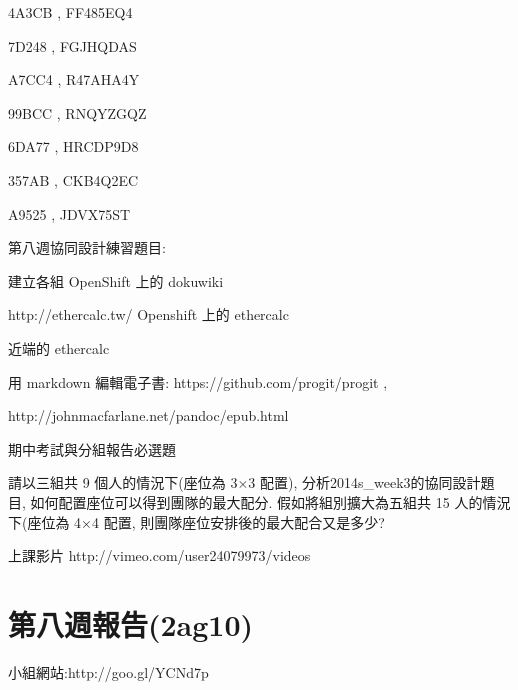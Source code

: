 \documentclass[]{article}
\begin{document}
4A3CB , FF485EQ4

7D248 , FGJHQDAS

A7CC4 , R47AHA4Y

99BCC , RNQYZGQZ

6DA77 , HRCDP9D8

357AB , CKB4Q2EC

A9525 , JDVX75ST

第八週協同設計練習題目:

建立各組 OpenShift 上的 dokuwiki

http://ethercalc.tw/ Openshift 上的 ethercalc

近端的 ethercalc

用 markdown 編輯電子書: https://github.com/progit/progit ,

http://johnmacfarlane.net/pandoc/epub.html

期中考試與分組報告必選題

請以三組共 9 個人的情況下(座位為 3×3 配置),
分析2014s\_week3的協同設計題目, 如何配置座位可以得到團隊的最大配分.
假如將組別擴大為五組共 15 人的情況下(座位為 4×4 配置,
則團隊座位安排後的最大配合又是多少?

上課影片 http://vimeo.com/user24079973/videos

\section{第八週報告(2ag10)}\label{ux7b2cux516bux9031ux5831ux544a2ag10}

小組網站:http://goo.gl/YCNd7p
\end{document}
